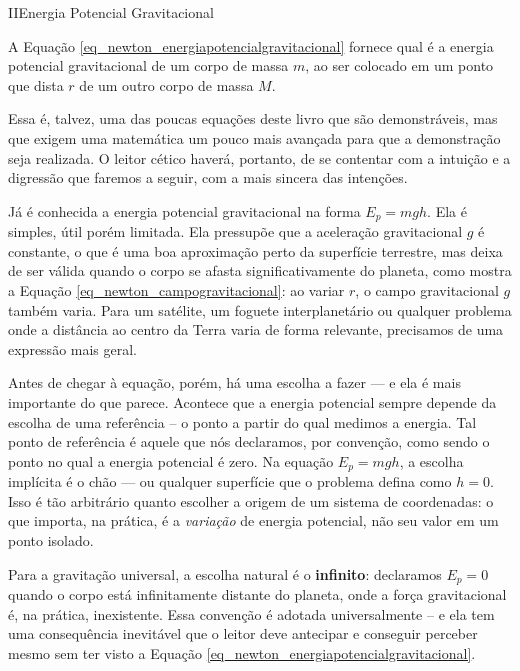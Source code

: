 \vspace{0.3cm}




\begin{secnivel}{II}{Energia Potencial Gravitacional}
 

  
\end{secnivel}





A Equação \eqref{eq_newton_energiapotencialgravitacional} fornece qual é a energia potencial gravitacional de um corpo de massa $m$, ao ser colocado em um ponto que dista $r$ de um outro corpo de massa $M.$ 

Essa é, talvez, uma das poucas equações deste livro que são demonstráveis, mas que exigem uma matemática um pouco mais avançada para que a demonstração seja realizada. O leitor cético haverá, portanto, de se contentar com a intuição e a digressão que faremos a seguir, com a mais sincera das intenções.


Já é conhecida a energia potencial gravitacional na forma
$E_p = mgh$. Ela é simples, útil porém limitada. Ela pressupõe que a
aceleração gravitacional $g$ é constante, o que é uma boa aproximação
perto da superfície terrestre, mas deixa de ser válida quando o corpo
se afasta significativamente do planeta, como mostra a Equação \eqref{eq_newton_campogravitacional}: ao variar $r$, o campo gravitacional $g$ também varia. Para um satélite, um foguete
interplanetário ou qualquer problema onde a distância ao centro da Terra
varia de forma relevante, precisamos de uma expressão mais geral.

Antes de chegar à equação, porém, há uma escolha a fazer --- e ela é
mais importante do que parece. Acontece que a energia potencial sempre depende da escolha de uma referência -- o ponto a partir do qual medimos a energia. Tal ponto de referência é aquele que nós declaramos, por convenção, como sendo o ponto no qual a energia potencial é zero. Na equação $E_p = mgh$, a escolha implícita é o chão --- ou qualquer superfície que o problema defina como $h = 0$.
Isso é tão arbitrário quanto escolher a origem de um sistema de
coordenadas: o que importa, na prática, é a \textit{variação} de
energia potencial, não seu valor em um ponto isolado.

Para a gravitação universal, a escolha natural é o \textbf{infinito}:
declaramos $E_p = 0$ quando o corpo está infinitamente distante do
planeta, onde a força gravitacional é, na prática, inexistente. Essa
convenção é adotada universalmente -- e ela tem uma consequência
inevitável que o leitor deve antecipar e conseguir perceber mesmo sem ter visto a Equação \eqref{eq_newton_energiapotencialgravitacional}.

